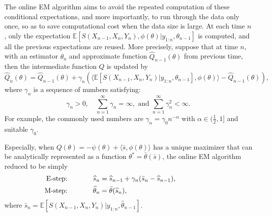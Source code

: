 \documentclass[12pt]{article}
\newcommand{\Ebr}[1]{\mathbb{E}\left[{#1}\right]}
\newcommand{\rbracket}[1]{\left(#1\right)}   %
\numberwithin{equation}{section}
\numberwithin{theorem}{section}
\begin{document}
The online EM algorithm aims to avoid the repeated computation of these conditional expectations, and more importantly, to run through the data only once, so as to save computational cost when the data size is large. At each time $n$, only the expectation $\Ebr{S(X_{n-1},X_n,Y_n),\phi(\theta)\big |y_{1:n},\theta_{n-1}}$ is computed, and all the previous expectations are reused.  More precisely, suppose that at time $n$, with an estimator $\theta_{n}$ and approximate function $\widehat{Q}_{n-1}(\theta)$ from previous time, then the intermediate function $Q$ is updated by 
 \[
 \widehat{Q}_n(\theta)=  \widehat{Q}_{n-1}(\theta)  + \gamma_n \rbracket{\langle\Ebr{S(X_{n-1},X_n,Y_n)\big |y_{1:n},\theta_{n-1}} ,\phi(\theta)\rangle -   \widehat{Q}_{n-1}(\theta)  },
 \]
where $\gamma_n$ is a sequence of numbers satisfying: 
\[
\gamma_n>0,\quad  \sum_{n=1}^\infty \gamma_n = \infty, \text{ and } \sum_{n=1}^\infty \gamma_n^2 < \infty.
\]
For example, the commonly used numbers are $\gamma_n = \gamma_0 n^{-\alpha}$ with $\alpha \in (\frac{1}{2},1]$ and suitable $\gamma_0$. 

Especially, when  $Q(\theta) = -\psi(\theta) + \langle \bar s, \phi(\theta)\rangle $  has a unique maximizer that can be analytically represented as a function $ \theta^{*} = \bar \theta(\bar{s})$, the online EM algorithm reduced to be simply 
\begin{equation}
\begin{aligned}
\text{ E-step:  \hspace{10mm} } & \widehat s_n = \widehat s_{n-1} + \gamma_n (\bar s_n - \widehat s_{n-1} ),\hspace{20mm}\\ 
\text{ M-step: \hspace{10mm} }  &  \widehat \theta_{n} = \bar \theta(\widehat s_n) ,
\end{aligned}
\end{equation}
where $\bar s_n = \Ebr{S(X_{n-1},X_n,Y_n)\big |y_{1:n},\widehat\theta_{n-1}}$. 


\end{document}
